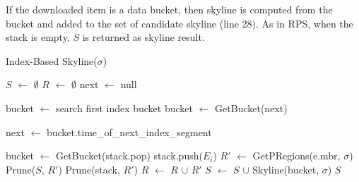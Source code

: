 If the downloaded item is a data bucket, then skyline is computed from the bucket and added to the set of candidate skyline (line 28). As in RPS, when the stack is empty, $S$ is returned as skyline result.

\begin{algorithm}
\caption{Index-Based Skyline($\sigma$)} \label{alg:IBSkyline}
\begin{algorithmic}[1]

\STATE $S$ $\gets$ $\emptyset$
\STATE $R$ $\gets$ $\emptyset$
\REPEAT
    \STATE next $\gets$ null

        \STATE bucket $\gets$ search first index bucket
    \ELSE
        \STATE bucket $\gets$ GetBucket(next)
    \ENDIF

        \STATE next $\gets$ bucket.time\_of\_next\_index\_segment
    \ENDIF

            \STATE bucket $\gets$ GetBucket(stack.pop)
        \ENDIF
                    \STATE stack.push($E_i$)
                    \STATE $R'$ $\gets$ GetPRegions(e.mbr, $\sigma$)
                    \STATE Prune($S$, $R'$)
                    \STATE Prune(stack, $R'$)
                    \STATE $R$ $\gets$ $R$ $\cup$ $R'$
                \ENDIF
            \ENDFOR
        \ELSE
            \STATE $S$ $\gets$ $S$ $\cup$ Skyline(bucket, $\sigma$)
        \ENDIF
    \ENDWHILE
{}
\RETURN $S$
\end{algorithmic}
\end{algorithm}

%


